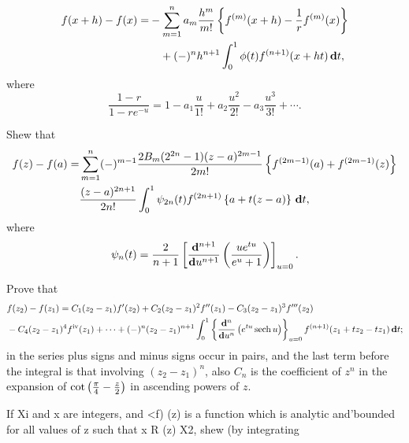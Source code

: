 \begin{wandwmiscexamples}
\begin{wandwmiscexample}
\begin{align*}
      f(x+h) - f(x)
      =&
      -
      \sum_{m=1}^{n}
      a_{m}
      \frac{h^{m}}{m!}
      \left\{ 
        f^{(m)}(x+h) - \frac{1}{r} f^{(m)}(x)
       \right\}
      \\
      & \quad
      +
      (-)^{n} h^{n+1}
      \int_{0}^{1}
      \phi(t) f^{(n+1)}(x+ht) \, \mathbf{d} t,
    \end{align*}
    where
    $$
    \frac{1-r}{1 - r e^{-u}}
    =
    1
    -
    a_{1} \frac{u}{1!}
    +
    a_{2} \frac{u^{2}}{2!}
    -
    a_{3} \frac{u^{3}}{3!}
    +
    \cdots.
    $$
  \end{wandwmiscexample}
  \begin{wandwmiscexample}
    Shew that
    \begin{align*}
      f(z) - f(a)
      =&
      \sum_{m=1}^{n}
      (-)^{m-1}
      \frac{2 B_{m} (2^{2n} - 1)(z-a)^{2m-1}}{2m!}
      \thebrace{
        f^{(2m-1)}(a)
        +
        f^{(2m-1)}(z)
      }
      \\
      &
      \hfill
      \frac{(z-a)^{2n+1}}{2n!}
      \int_{0}^{1}
      \psi_{2n}(t)
      f^{(2n+1)}\thebrace{
        a + t(z-a)
      }
      \dmeasure t,
    \end{align*}
    where
    $$
    \psi_{n}(t)
    =
    \frac{2}{n+1}
    \left[ 
      \frac{\mathbf{d}^{n+1}}{\mathbf{d} u^{n+1}}
      \left( 
        \frac{u e^{tu}}{e^{u} + 1}
       \right)
     \right]_{u=0}.
    $$
  \end{wandwmiscexample}
  \begin{wandwmiscexample}
    Prove that
    \begin{align*}
      &
      f(z_{2}) - f(z_{1})
      =
      C_{1} (z_{2} - z_{1}) f'(z_{2})
      +
      C_{2} (z_{2} - z_{1})^{2} f''(z_{1})
      -
      C_{3} (z_{2} - z_{1})^{3} f'''(z_{2})
      \\
      &
      -C_{4} (z_{2}-z_{1})^{4} f^{\textrm{iv}}(z_{1})
      +
      \cdots
      +
      (-)^{n} (z_{2} - z_{1})^{n+1}
      \int_{0}^{1}
      \left\{ 
        \frac{\mathbf{d}^{n}}{\mathbf{d} u^{n}}
        \left( 
          e^{tu} \operatorname{sech} u
         \right)
       \right\}_{u=0}
      f^{(n+1)}(z_{1} + t z_{2} - t z_{1})
      \, \mathbf{d} t;
    \end{align*}
    in the series plus signs and minus signs occur in pairs, and the last
    term before the integral is that involving
    $(z_{2}-z_{1})^{n}$, also $C_{n}$ is the
    coefficient of $z^{n}$ in the expansion of
    $\cot\left( \frac{\pi}{4} - \frac{z}{2} \right)$
    in ascending powers of $z$. 
  \end{wandwmiscexample}
  \begin{wandwmiscexample}
    If Xi and x are integers, and <f) (z) is a function which is
    analytic and'bounded for all values of z such that x R (z) X2, shew
    (by integrating


\end{wandwmiscexample}
\end{wandwmiscexamples}
